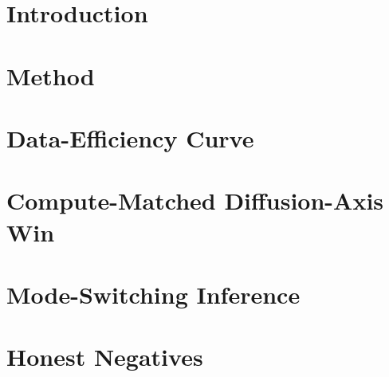 \documentclass[11pt]{article}
\begin{document}
\begin{abstract}
\textbf{Honest negatives.} Composite is uniformly $+0.1$--$0.2$ NLL
worse on OOD prose; slightly worse-calibrated at $4$ of $5$ scales;
$305$M supervised fine-tuning on GSM8K-train learns the answer
\emph{format} but not the underlying arithmetic; a REINFORCE-trained
mode router (frozen backbone, $526$K parameter MLP) collapses loop
rate ($0.69 \to 0.00$) but does not lift task accuracy. Exclusive
Self Attention (XSA, arxiv:2603.09078) tested as a drop-in
attention modification shows no benefit at $60$M.

As a secondary diagnostic finding, we document a free-run
sample-quality failure mode that appears at FineWeb-Edu scale
($305$M $/$ $3$B tokens) but is invisible to teacher-forced NLL,
identify three independent root causes (decoder wiring, prompt-format
OOD, Chinchilla undertrain), and apply two decoder-side fixes
(AR-side anti-repetition + count-based repetition penalty on the
diffusion head) that recover coherent generations without retraining.
\end{abstract}

\section{Introduction}


\section{Method}


\section{Data-Efficiency Curve}
\label{sec:results-curve}


\section{Compute-Matched Diffusion-Axis Win}
\label{sec:results-compute}


\section{Mode-Switching Inference}
\label{sec:results-modeswitch}


\section{Honest Negatives}
\label{sec:results-negatives}

\end{document}
